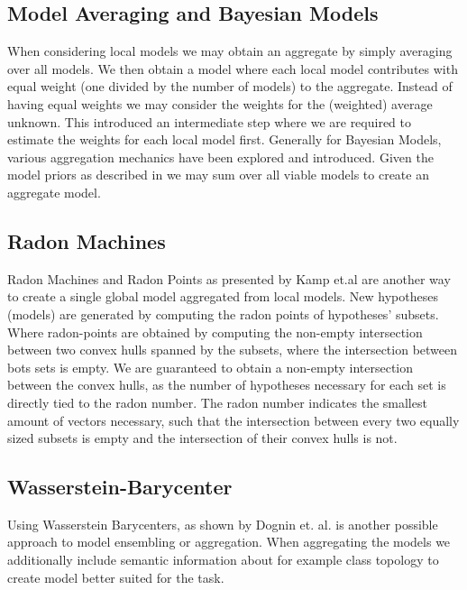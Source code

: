    \subsection{Model Averaging and Bayesian Models}
    When considering local models we may obtain an aggregate by simply averaging over all models. We then obtain a model where each local model contributes with equal weight (one divided by the number of models) to the aggregate. 
    Instead of having equal weights we may consider the weights for the (weighted) average unknown. This introduced an intermediate step where we are required to estimate the weights for each local model first.
    Generally for Bayesian Models, various aggregation mechanics have been explored and introduced.
    Given the model priors as described in \cite{hoeting1999bayesian} we may sum over all viable models to create an aggregate model.
    
    \subsection{Radon Machines}
    Radon Machines and Radon Points as presented by Kamp et.al \cite{kamp2017effective} are another way to create a single global model aggregated from local models. New hypotheses (models) are generated by computing the radon points of hypotheses' subsets. Where radon-points are obtained by computing the non-empty intersection between two convex hulls spanned by the subsets, where the intersection between bots sets is empty.
    We are guaranteed to obtain a non-empty intersection between the convex hulls, as the number of hypotheses necessary for each set is directly tied to the radon number. 
    The radon number indicates the smallest amount of vectors necessary, such that the intersection between every two equally sized subsets is empty and the intersection of their convex hulls is not.
    
    \subsection{Wasserstein-Barycenter}
      Using Wasserstein Barycenters, as shown by Dognin et. al. \cite{dognin2019wasserstein} is another possible approach to model ensembling or aggregation. When aggregating the models we additionally include semantic information about for example class topology to create model better suited for the task.
   
